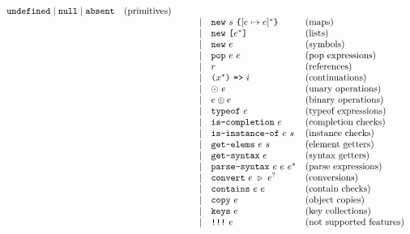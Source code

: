 \[\begin{array}{lrclrll}
          \C{undefined} \mid \C{null} \mid \C{absent}           & \text{(primitives)}\\
    &&&&\mid& \C{new}\ \str\ \C{\{}[\expr \mapsto \expr]^*\C{\}}& \text{(maps)}\\
    &&&&\mid& \C{new}\ \C{[} \expr^* \C{]}                      & \text{(lists)}\\
    &&&&\mid& \C{new}\ \expr                                    & \text{(symbols)}\\
    &&&&\mid& \C{pop}\ \expr\ \expr                             & \text{(pop expressions)}\\
    &&&&\mid& \refer                                            & \text{(references)}\\
    &&&&\mid& \C{(} \id^* \C{)}\ \C{=>}\ \inst                & \text{(continuations)}\\
    &&&&\mid& \uop\ \expr                                       & \text{(unary operations)}\\
    &&&&\mid& \expr \bop \expr                                  & \text{(binary operations)}\\
    &&&&\mid& \C{typeof}\ \expr                                 & \text{(typeof expressions)}\\
    &&&&\mid& \C{is-completion}\ \expr                          & \text{(completion checks)}\\
    &&&&\mid& \C{is-instance-of}\ \expr\ \str                   & \text{(instance checks)}\\
    &&&&\mid& \C{get-elems}\ \expr\ \str                        & \text{(element getters)}\\
    &&&&\mid& \C{get-syntax}\ \expr                             & \text{(syntax getters)}\\
    &&&&\mid& \C{parse-syntax}\ \expr\ \expr\ \expr^*           & \text{(parse expressions)}\\
    &&&&\mid& \C{convert}\ \expr\ \cop\ \expr^?                 & \text{(conversions)}\\
    &&&&\mid& \C{contains}\ \expr\ \expr                        & \text{(contain checks)}\\
    &&&&\mid& \C{copy}\ \expr                                   & \text{(object copies)}\\
    &&&&\mid& \C{keys}\ \expr                                   & \text{(key collections)}\\
    &&&&\mid& \C{!!!}\ \expr                                    & \text{(not supported features)}\\
  \end{array}
\]

